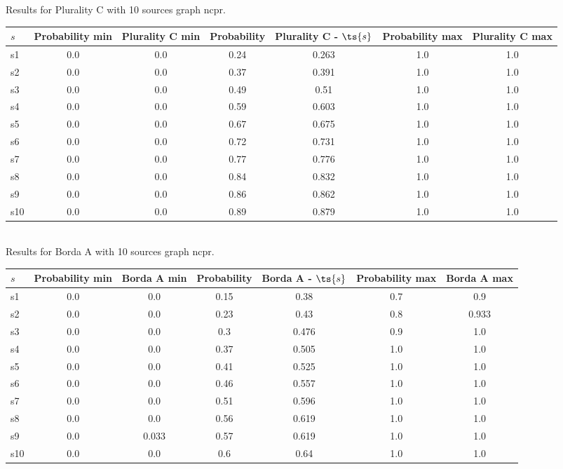 \documentclass{article}
\begin{document}
\noindent Results for Plurality C with 10 sources graph ncpr.

\noindent\begin{tabular}{|l|c|c|c|c|c|c|}
\hline
$s$& Probability min & Plurality C min & Probability & Plurality C - $\ts{s}$ & Probability max & Plurality C max\\
\hline
s1 &0.0 & 0.0 & 0.24 & 0.263 & 1.0 & 1.0\\
\hline
s2 &0.0 & 0.0 & 0.37 & 0.391 & 1.0 & 1.0\\
\hline
s3 &0.0 & 0.0 & 0.49 & 0.51 & 1.0 & 1.0\\
\hline
s4 &0.0 & 0.0 & 0.59 & 0.603 & 1.0 & 1.0\\
\hline
s5 &0.0 & 0.0 & 0.67 & 0.675 & 1.0 & 1.0\\
\hline
s6 &0.0 & 0.0 & 0.72 & 0.731 & 1.0 & 1.0\\
\hline
s7 &0.0 & 0.0 & 0.77 & 0.776 & 1.0 & 1.0\\
\hline
s8 &0.0 & 0.0 & 0.84 & 0.832 & 1.0 & 1.0\\
\hline
s9 &0.0 & 0.0 & 0.86 & 0.862 & 1.0 & 1.0\\
\hline
s10 &0.0 & 0.0 & 0.89 & 0.879 & 1.0 & 1.0\\
\hline
\end{tabular}\\

\noindent Results for Borda A with 10 sources graph ncpr.

\noindent\begin{tabular}{|l|c|c|c|c|c|c|}
\hline
$s$& Probability min & Borda A min & Probability & Borda A - $\ts{s}$ & Probability max & Borda A max\\
\hline
s1 &0.0 & 0.0 & 0.15 & 0.38 & 0.7 & 0.9\\
\hline
s2 &0.0 & 0.0 & 0.23 & 0.43 & 0.8 & 0.933\\
\hline
s3 &0.0 & 0.0 & 0.3 & 0.476 & 0.9 & 1.0\\
\hline
s4 &0.0 & 0.0 & 0.37 & 0.505 & 1.0 & 1.0\\
\hline
s5 &0.0 & 0.0 & 0.41 & 0.525 & 1.0 & 1.0\\
\hline
s6 &0.0 & 0.0 & 0.46 & 0.557 & 1.0 & 1.0\\
\hline
s7 &0.0 & 0.0 & 0.51 & 0.596 & 1.0 & 1.0\\
\hline
s8 &0.0 & 0.0 & 0.56 & 0.619 & 1.0 & 1.0\\
\hline
s9 &0.0 & 0.033 & 0.57 & 0.619 & 1.0 & 1.0\\
\hline
s10 &0.0 & 0.0 & 0.6 & 0.64 & 1.0 & 1.0\\
\hline
\end{tabular}\\
\end{document}
